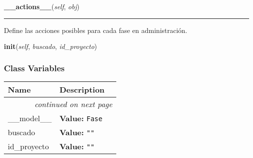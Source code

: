 \hspace{.8\funcindent}\begin{boxedminipage}{\funcwidth}

    \raggedright \textbf{\_\_actions\_\_}(\textit{self}, \textit{obj})

    \vspace{-1.5ex}

    \rule{\textwidth}{0.5\fboxrule}
\setlength{\parskip}{2ex}
    Define las acciones posibles para cada fase en administración.

\setlength{\parskip}{1ex}
    \end{boxedminipage}

    \label{saip:controllers:fase_controller:FaseTableFiller:init}

    \vspace{0.5ex}

\hspace{.8\funcindent}\begin{boxedminipage}{\funcwidth}

    \raggedright \textbf{init}(\textit{self}, \textit{buscado}, \textit{id\_proyecto})

\setlength{\parskip}{2ex}
\setlength{\parskip}{1ex}
    \end{boxedminipage}



  \subsubsection{Class Variables}

    \vspace{-1cm}
\hspace{\varindent}\begin{longtable}{|p{\varnamewidth}|p{\vardescrwidth}|l}
\cline{1-2}
\cline{1-2} \centering \textbf{Name} & \centering \textbf{Description}& \\
\cline{1-2}
\endhead\cline{1-2}\multicolumn{3}{r}{\small\textit{continued on next page}}\\\endfoot\cline{1-2}
\endlastfoot\raggedright \_\-\_\-m\-o\-d\-e\-l\-\_\-\_\- & \raggedright \textbf{Value:} 
{\tt Fase}&\\
\cline{1-2}
\raggedright b\-u\-s\-c\-a\-d\-o\- & \raggedright \textbf{Value:} 
{\tt ""}&\\
\cline{1-2}
\raggedright i\-d\-\_\-p\-r\-o\-y\-e\-c\-t\-o\- & \raggedright \textbf{Value:} 
{\tt ""}&\\
\cline{1-2}
\end{longtable}

